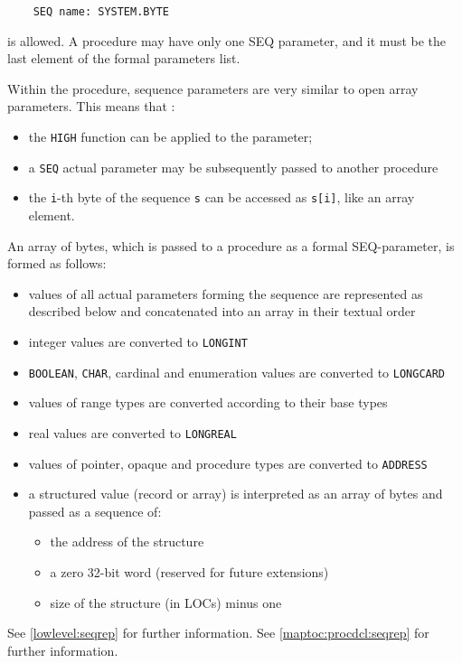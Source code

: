 \verb'    SEQ name: SYSTEM.BYTE'

is allowed. A procedure may have only one SEQ parameter, and it must be
the last element of the formal parameters list.

Within the procedure, sequence parameters are very similar to open
array parameters. This means that :
\begin{itemize}
\item the {\tt HIGH} function can be applied to the parameter;
\item a {\tt SEQ} actual parameter may be subsequently passed to another procedure
\item the \verb|i|-th byte of the sequence \verb|s|
      can be accessed as \verb|s[i]|, like an array element.
\end{itemize}

An array of bytes, which is passed to a procedure as a formal
SEQ-parameter, is formed as follows:
\begin{itemize}
\item
  values of all actual parameters forming the sequence are represented
  as described below and concatenated into an array in their textual order
\item integer values are converted to {\tt LONGINT}
\item {\tt BOOLEAN}, {\tt CHAR}, cardinal and enumeration values are converted
      to {\tt LONGCARD}
\item values of range types are converted according to their
      base types
\item real values are converted to {\tt LONGREAL}
\item values of pointer, opaque and procedure types
are converted to {\tt ADDRESS}
\item
    a structured value (record or array) is interpreted
    as an array of bytes and passed as a sequence
    of:
    \begin{itemize}
    \item the address of the structure
    \item a zero 32-bit word (reserved for future extensions)
    \item size of the structure (in LOCs) minus one
    \end{itemize}
\end{itemize}

\ifgencode
  See \ref{lowlevel:seqrep} for further information. 
\fi
\ifgenc
  See \ref{maptoc:procdcl:seqrep} for further information. 
\fi


